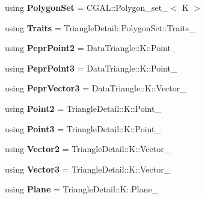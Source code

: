 \begin{DoxyCompactItemize}
using {\bfseries Polygon\+Set} = C\+G\+A\+L\+::\+Polygon\+\_\+set\+\_$<$ K $>$
\item 
\mbox{\label{classpepr3d_1_1_triangle_detail_a0dd0c71e30197e8ea3917e609aa3b4ed}} 
using {\bfseries Traits} = Triangle\+Detail\+::\+Polygon\+Set\+::\+Traits\+\_
\item 
\mbox{\label{classpepr3d_1_1_triangle_detail_afd25e5b8b0ca3a320f8de2f1233e60bd}} 
using {\bfseries Pepr\+Point2} = Data\+Triangle\+::\+K\+::\+Point\+\_
\item 
\mbox{\label{classpepr3d_1_1_triangle_detail_ab41625f7067e442f5840dc1ab8bcf2c4}} 
using {\bfseries Pepr\+Point3} = Data\+Triangle\+::\+K\+::\+Point\+\_
\item 
\mbox{\label{classpepr3d_1_1_triangle_detail_a2e9128e6fe7dc22dd5f6377282e39ae1}} 
using {\bfseries Pepr\+Vector3} = Data\+Triangle\+::\+K\+::\+Vector\+\_
\item 
\mbox{\label{classpepr3d_1_1_triangle_detail_ab85cd57fea1decf01a3afe6fbe3ee135}} 
using {\bfseries Point2} = Triangle\+Detail\+::\+K\+::\+Point\+\_
\item 
\mbox{\label{classpepr3d_1_1_triangle_detail_a575c3b3f3196a6f23b1944eeb628813a}} 
using {\bfseries Point3} = Triangle\+Detail\+::\+K\+::\+Point\+\_
\item 
\mbox{\label{classpepr3d_1_1_triangle_detail_afe6926469de5e0dec620a0b640b1968a}} 
using {\bfseries Vector2} = Triangle\+Detail\+::\+K\+::\+Vector\+\_
\item 
\mbox{\label{classpepr3d_1_1_triangle_detail_a61a5b3b8f778b46b50f6d01d62de8a49}} 
using {\bfseries Vector3} = Triangle\+Detail\+::\+K\+::\+Vector\+\_
\item 
\mbox{\label{classpepr3d_1_1_triangle_detail_ac51978cae21325ae859138c55c9b1f24}} 
using {\bfseries Plane} = Triangle\+Detail\+::\+K\+::\+Plane\+\_

\end{DoxyCompactItemize}
